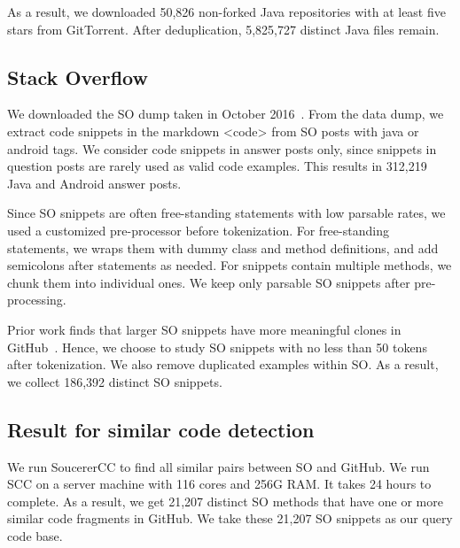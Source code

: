 As a result, we downloaded 50,826 non-forked Java repositories with at least five stars from GitTorrent. After deduplication, 5,825,727 distinct Java files remain.


\subsection{Stack Overflow}
We downloaded the SO dump taken in October 2016~\cite{stackexchange}. From the data dump, we extract code snippets in the markdown {\ttt <code>} from SO posts with {\ttt java} or {\ttt android} tags.
We consider code snippets in answer posts only, since snippets in question posts are rarely used as valid code examples. This results in 312,219 Java and Android answer posts.

Since SO snippets are often free-standing statements with low parsable rates, we used a customized pre-processor before tokenization. For free-standing statements, we wraps them with dummy class and method definitions, and add semicolons after statements as needed. For snippets contain multiple methods, we chunk them into individual ones. We keep only parsable SO snippets after pre-processing.

Prior work finds that larger SO snippets have more meaningful clones in GitHub~\cite{yang2017stack}. Hence, we choose to study SO snippets with no less than 50 tokens after tokenization. We also remove duplicated examples within SO. As a result, we collect 186,392 distinct SO snippets.

\subsection{Result for similar code detection}
We run SoucererCC to find all similar pairs between SO and GitHub. We run SCC on a server machine with 116 cores and 256G RAM. It takes 24 hours to complete. As a result, we get 21,207 distinct SO methods that have one or more similar code fragments in GitHub. We take these 21,207 SO snippets as our query code base.